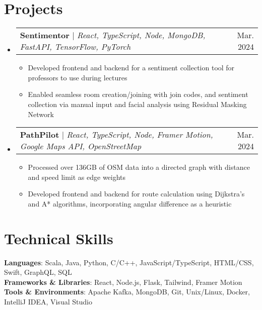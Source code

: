 \documentclass[letterpaper,12pt]{article}
\makeatletter
\newcommand{\resumeItem}[1]{
  \item\small{
    {#1 \vspace{-2pt}}
  }
}
\newcommand{\resumeProjectHeading}[2]{
    \item
    \begin{tabular*}{0.97\textwidth}{l@{\extracolsep{\fill}}r}
      \small#1 & #2 \\
    \end{tabular*}\vspace{-7pt}
}
\newcommand{\resumeSubHeadingListStart}{\begin{itemize}[leftmargin=0.15in, label={}]}
\newcommand{\resumeSubHeadingListEnd}{\end{itemize}}
\newcommand{\resumeItemListStart}{\begin{itemize}}
\newcommand{\resumeItemListEnd}{\end{itemize}\vspace{-5pt}}
\makeatother
\begin{document}
\section{Projects}
    \resumeSubHeadingListStart
      \resumeProjectHeading
          {\textbf{Sentimentor} $|$ \emph{React, TypeScript, Node, MongoDB, FastAPI, TensorFlow, PyTorch}}{Mar. 2024}
          \resumeItemListStart
            \resumeItem{Developed frontend and backend for a sentiment collection tool for professors to use during lectures}
            \resumeItem{Enabled seamless room creation/joining with join codes, and sentiment collection via manual input and facial analysis using Residual Masking Network}
          \resumeItemListEnd
      \resumeProjectHeading
          {\textbf{PathPilot} $|$ \emph{React, TypeScript, Node, Framer Motion, Google Maps API, OpenStreetMap}}{Mar. 2024}
          \resumeItemListStart
            \resumeItem{Processed over 136GB of OSM data into a directed graph with distance and speed limit as edge weights}
            \resumeItem{Developed frontend and backend for route calculation using Dijkstra’s and A* algorithms, incorporating angular difference as a heuristic}
          \resumeItemListEnd
    \resumeSubHeadingListEnd


\section{Technical Skills}
 \begin{itemize}[leftmargin=0.15in, label={}]
    \small{\item{
     \textbf{Languages}{: Scala, Java, Python, C/C++, JavaScript/TypeScript, HTML/CSS, Swift, GraphQL, SQL} \\
     \textbf{Frameworks \& Libraries}{: React, Node.js, Flask, Tailwind, Framer Motion} \\
     \textbf{Tools \& Environments}{: Apache Kafka, MongoDB, Git, Unix/Linux, Docker, IntelliJ IDEA, Visual Studio} \\
    }}
 \end{itemize}
\end{document}
